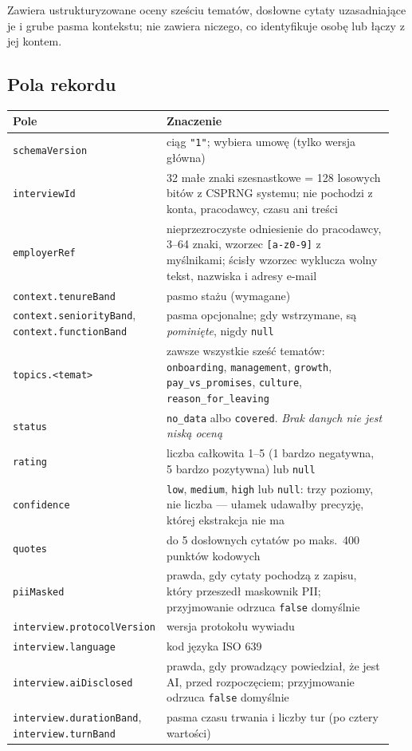  Zawiera
ustrukturyzowane oceny sześciu tematów, dosłowne cytaty uzasadniające je
i grube pasma kontekstu; nie zawiera niczego, co identyfikuje osobę lub łączy
z jej kontem.

\subsection{Pola rekordu}

\begin{longtable}{@{}p{0.3\linewidth}p{0.65\linewidth}@{}}
\toprule
Pole & Znaczenie \\
\midrule
\endhead
\texttt{schemaVersion} & ciąg \texttt{"1"}; wybiera umowę (tylko wersja główna) \\
\texttt{interviewId} & 32 małe znaki szesnastkowe = 128 losowych bitów z CSPRNG
  systemu; nie pochodzi z konta, pracodawcy, czasu ani treści \\
\texttt{employerRef} & nieprzezroczyste odniesienie do pracodawcy, 3--64 znaki,
  wzorzec \texttt{[a-z0-9]} z myślnikami; ścisły wzorzec wyklucza wolny tekst,
  nazwiska i adresy e-mail \\
\texttt{context.tenureBand} & pasmo stażu (wymagane) \\
\texttt{context.seniorityBand}, \texttt{context.functionBand} & pasma opcjonalne;
  gdy wstrzymane, są \emph{pominięte}, nigdy \texttt{null} \\
\texttt{topics.<temat>} & zawsze wszystkie sześć tematów:
  \texttt{onboarding}, \texttt{management}, \texttt{growth},
  \texttt{pay\_vs\_promises}, \texttt{culture}, \texttt{reason\_for\_leaving} \\
\texttt{status} & \texttt{no\_data} albo \texttt{covered}. \emph{Brak danych
  nie jest niską oceną} \\
\texttt{rating} & liczba całkowita 1--5 (1 bardzo negatywna, 5 bardzo
  pozytywna) lub \texttt{null} \\
\texttt{confidence} & \texttt{low}, \texttt{medium}, \texttt{high} lub
  \texttt{null}: trzy poziomy, nie liczba --- ułamek udawałby precyzję,
  której ekstrakcja nie ma \\
\texttt{quotes} & do 5 dosłownych cytatów po maks.\ 400 punktów kodowych \\
\texttt{piiMasked} & prawda, gdy cytaty pochodzą z zapisu, który przeszedł
  maskownik PII; przyjmowanie odrzuca \texttt{false} domyślnie \\
\texttt{interview.protocolVersion} & wersja protokołu wywiadu \\
\texttt{interview.language} & kod języka ISO 639 \\
\texttt{interview.aiDisclosed} & prawda, gdy prowadzący powiedział, że jest AI,
  przed rozpoczęciem; przyjmowanie odrzuca \texttt{false} domyślnie \\
\texttt{interview.durationBand}, \texttt{interview.turnBand} & pasma czasu trwania
  i liczby tur (po cztery wartości) \\
\bottomrule
\end{longtable}

